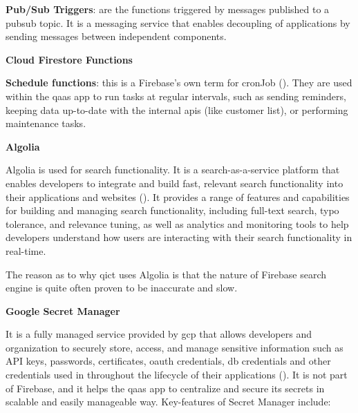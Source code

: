 \begin{multicols}{2}
      \textbf{Pub/Sub Triggers}: are the functions triggered by messages published to a \acrshort{pubsub} topic.
      It is a messaging service that enables decoupling of applications by sending messages between independent components.

      \textbf{Cloud Firestore Functions}

      \textbf{Schedule functions}: this is a Firebase's own term for \gls{cronJob} (\textit{\cite{scheduleFunction}}).
      They are used within the \acrshort{qaas} app to run tasks at regular intervals, such as sending reminders, keeping
      data up-to-date with the internal \acrshort{api}s (like customer list), or performing maintenance tasks.

      \textbf{Algolia}

      Algolia is used for search functionality. It is a search-as-a-service platform that enables developers to
      integrate and build fast, relevant search functionality into their applications and websites
      (\textit{\cite{algolia}}). It provides a range of features and capabilities for building and managing search
      functionality, including full-text search, typo tolerance, and relevance tuning, as well as analytics and
      monitoring tools to help developers understand how users are interacting with their search functionality in
      real-time.

      The reason as to why \acrshort{qict} uses Algolia is that the nature of Firebase search engine is quite often
      proven to be inaccurate and slow.

      \textbf{Google Secret Manager}

      It is a fully managed service provided by \acrshort{gcp} that allows developers and organization to securely store,
      access, and manage sensitive information such as API keys, passwords, certificates, \acrshort{oauth} credentials,
      \acrshort{db} credentials and other credentials used in throughout the lifecycle of their applications
      (\textit{\cite{googlesecretmanager}}). It is not part of Firebase, and it helps the \acrshort{qaas} app to centralize and
      secure its secrets in scalable and easily manageable way. Key-features of Secret Manager include:


\end{multicols}
